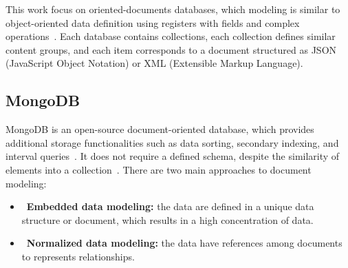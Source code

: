 \documentclass{svproc}
\begin{document}
This work focus on oriented-documents databases, which modeling is similar to object-oriented data definition using registers with fields and complex operations~\cite{patil:2017}. 
Each database contains collections, each collection defines similar content groups, and each item corresponds to a document structured as JSON (JavaScript Object Notation) or XML (Extensible Markup Language).

\subsection{MongoDB}



MongoDB is an open-source document-oriented database, which provides additional storage functionalities such as data sorting, secondary indexing, and interval queries~\cite{membrey2011definitive}.
It does not require a defined schema, despite the similarity of elements into a collection~\cite{kanade2014study,lutu2015big}. There are two main approaches to document modeling:


\begin{itemize}
\item~\textbf{Embedded data modeling:} the data are defined in a unique data structure or document, which results in a high concentration of data.
\item~\textbf{Normalized data modeling:} the data have references among documents to represents relationships.     
\end{itemize}
\end{document}
